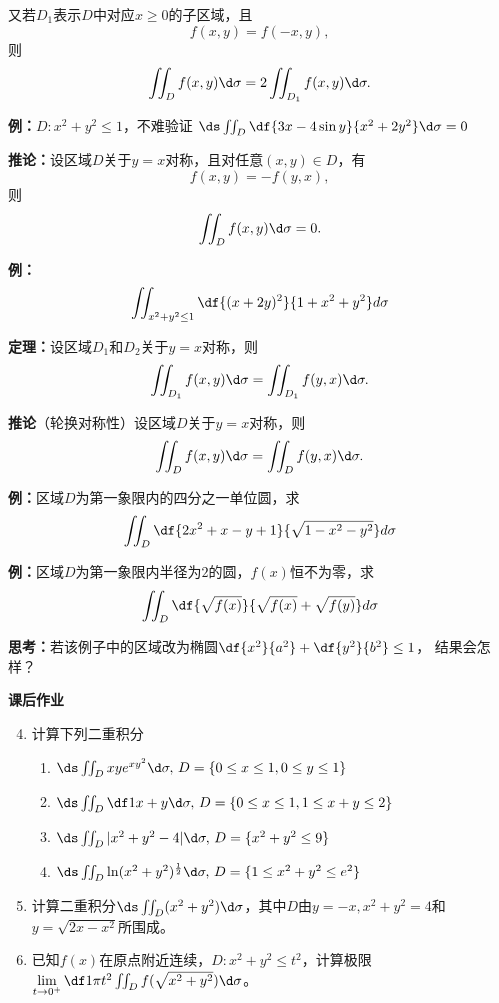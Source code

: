 又若$D_1$表示$D$中对应$x\geq0$的子区域，且
$$f(x,y)=f(-x,y),$$
则
$$\iint_Df(x,y)\d\sigma=2\iint_{D_1}f(x,y)\d\sigma.$$

{\bf 例：}$D:x^2+y^2\leq 1$，不难验证
$\ds\iint_D\df{3x-4\sin y}{x^2+2y^2}\d\sigma=0$

{\bf 推论：}设区域$D$关于$y=x$对称，且对任意$(x,y)\in D$，有
$$f(x,y)=-f(y,x),$$
则
$$\iint_Df(x,y)\d\sigma=0.$$

{\bf 例：}$$\iint_{x^2+y^2\leq 1}\df{(x+2y)^2}{1+x^2+y^2}d\sigma$$

{\bf 定理：}设区域$D_1$和$D_2$关于$y=x$对称，则
$$\iint_{D_1}f(x,y)\d\sigma=\iint_{D_1}f(y,x)\d\sigma.$$

{\bf 推论}（轮换对称性）设区域$D$关于$y=x$对称，则
$$\iint_Df(x,y)\d\sigma=\iint_Df(y,x)\d\sigma.$$

{\bf 例：}区域$D$为第一象限内的四分之一单位圆，求
$$\iint_D\df{2x^2+x-y+1}{\sqrt{1-x^2-y^2}}d\sigma$$


{\bf 例：}区域$D$为第一象限内半径为$2$的圆，$f(x)$恒不为零，求
$$\iint_D\df{\sqrt{f(x)}}{\sqrt{f(x)}+\sqrt{f(y)}}d\sigma$$

{\bf 思考：}若该例子中的区域改为椭圆$\df{x^2}{a^2}+\df{y^2}{b^2}\leq 1$，
结果会怎样？

\begin{ext}
	{\bf 课后作业}
	\begin{enumerate}
	  \setcounter{enumi}{3}
	  \item 计算下列二重积分
		\begin{enumerate}[(1)]
		  \item $\ds\iint_Dxye^{xy^2}\d\sigma,\,D=\{0\leq x\leq 1,0\leq
		  y\leq 1\}$ 
		  \item $\ds\iint_D\df 1{x+y}\d\sigma,\,D=\{0\leq x\leq 1,1\leq x+y\leq
		  2\}$ 
		  \item $\ds\iint_D|x^2+y^2-4|\d\sigma,\,D=\{x^2+y^2\leq 9\}$ 
		  \item $\ds\iint_D\ln(x^2+y^2)^{\frac12}\d\sigma,\,
		  D=\{1\leq x^2+y^2\leq e^2\}$
		\end{enumerate}
	  \item 计算二重积分$\ds\iint_D(x^2+y^2)\d\sigma$，其中$D$由$y=-x,
	  x^2+y^2=4$和$y=\sqrt{2x-x^2}$所围成。
	  \item 已知$f(x)$在原点附近连续，$D:x^2+y^2\leq t^2$，计算极限
	  $\lim\limits_{t\to0^+}\df1{\pi t^2}\iint_Df(\sqrt{x^2+y^2})\d\sigma$。
	\end{enumerate}
\end{ext}

